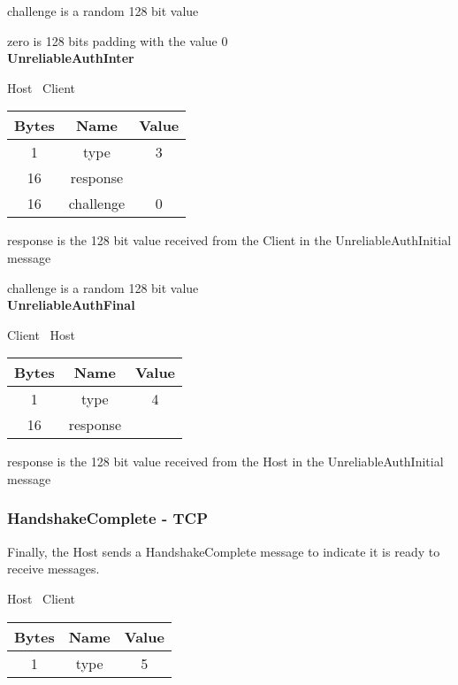challenge is a random 128 bit value

zero is 128 bits padding with the value 0\\

\textbf{UnreliableAuthInter}
\begin{center}
    Host \textrightarrow\ Client\\
    \begin{tabular}{|c|c|c|}
        \hline
        \textbf{Bytes} & \textbf{Name} & \textbf{Value} \\
        \hline
        1              & type          & 3              \\
        \hline
        16             & response     &                \\
        \hline
        16             & challenge          & 0              \\
        \hline
    \end{tabular}
\end{center}

response is the 128 bit value received from the Client in the UnreliableAuthInitial message

challenge is a random 128 bit value\\

\textbf{UnreliableAuthFinal}
\begin{center}
    Client \textrightarrow\ Host\\
    \begin{tabular}{|c|c|c|}
        \hline
        \textbf{Bytes} & \textbf{Name} & \textbf{Value} \\
        \hline
        1              & type          & 4              \\
        \hline
        16             & response     &                \\
        \hline
    \end{tabular}
\end{center}

response is the 128 bit value received from the Host in the UnreliableAuthInitial message

\subsubsection{HandshakeComplete - TCP}

Finally, the Host sends a HandshakeComplete message to indicate it is ready to receive messages.

\begin{center}
    Host \textrightarrow\ Client\\
    \begin{tabular}{|c|c|c|}
        \hline
        \textbf{Bytes} & \textbf{Name} & \textbf{Value} \\
        \hline
        1              & type          & 5              \\
        \hline
    \end{tabular}
\end{center}

